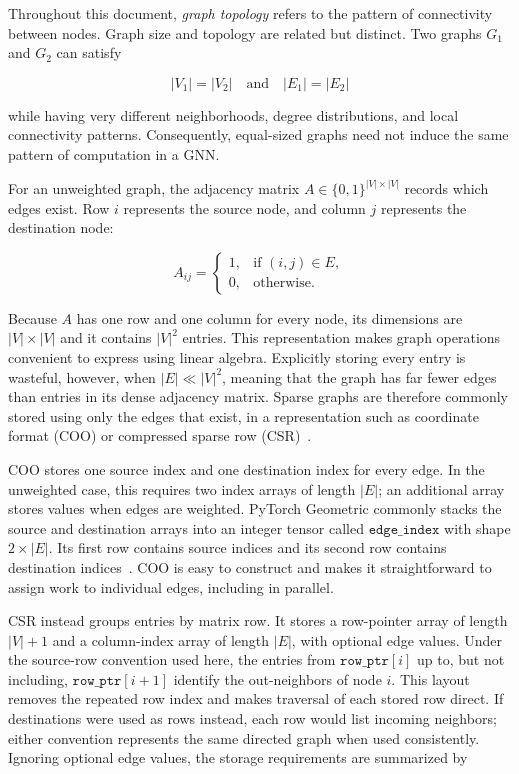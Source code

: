 Throughout this document, \emph{graph topology} refers to the pattern of
connectivity between nodes. Graph size and topology are related but distinct.
Two graphs $G_1$ and $G_2$ can satisfy

\begin{equation}
  |V_1| = |V_2| \quad\text{and}\quad |E_1| = |E_2|
  \label{eq:same-size-different-topology}
\end{equation}

while having very different neighborhoods, degree distributions, and local
connectivity patterns. Consequently, equal-sized graphs need not induce the
same pattern of computation in a GNN.

For an unweighted graph, the adjacency matrix
$A \in \{0,1\}^{|V|\times|V|}$ records which edges exist. Row $i$
represents the source node, and column $j$ represents the destination node:

\begin{equation}
  A_{ij} =
  \begin{cases}
    1, & \text{if } (i,j) \in E, \\
    0, & \text{otherwise}.
  \end{cases}
  \label{eq:adjacency-matrix}
\end{equation}

Because $A$ has one row and one column for every node, its dimensions are
$|V|\times|V|$ and it contains $|V|^2$ entries. This representation makes graph
operations convenient to express using linear algebra. Explicitly storing every
entry is wasteful, however, when $|E| \ll |V|^2$, meaning that the graph has far
fewer edges than entries in its dense adjacency matrix. Sparse graphs are
therefore commonly stored using only the edges that exist, in a representation
such as coordinate format (COO) or compressed sparse row
(CSR)~\cite{pytorchSparseDocs}.

COO stores one source index and one destination index for every edge. In the
unweighted case, this requires two index arrays of length $|E|$; an additional
array stores values when edges are weighted. PyTorch Geometric commonly stacks
the source and destination arrays into an integer tensor called
$\texttt{edge\_index}$ with shape $2\times|E|$. Its first row contains source
indices and its second row contains destination indices~\cite{pygEdgeIndex}.
COO is easy to construct and makes it straightforward to assign work to individual edges, including in parallel.

CSR instead groups entries by matrix row. It stores a row-pointer array of
length $|V|+1$ and a column-index array of length $|E|$, with optional edge
values. Under the source-row convention used here, the entries from
$\texttt{row\_ptr}[i]$ up to, but not including,
$\texttt{row\_ptr}[i+1]$ identify the out-neighbors of node $i$. This layout
removes the repeated row index and makes traversal of each stored row direct. If
destinations were used as rows instead, each row would list incoming neighbors;
either convention represents the same directed graph when used consistently.
Ignoring optional edge values, the storage requirements are summarized by


